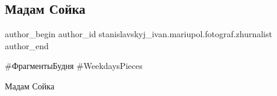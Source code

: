  
 
 
 
 

\subsection{Мадам Сойка}
\label{sec:21_06_2020.fb.stanislavskyj_ivan.mariupol.fotograf.zhurnalist.1.madam_sojka}

\ifcmt
 author_begin
   author_id stanislavskyj_ivan.mariupol.fotograf.zhurnalist
 author_end
\fi

\#ФрагментыБудня \#WeekdaysPieces

Мадам Сойка

